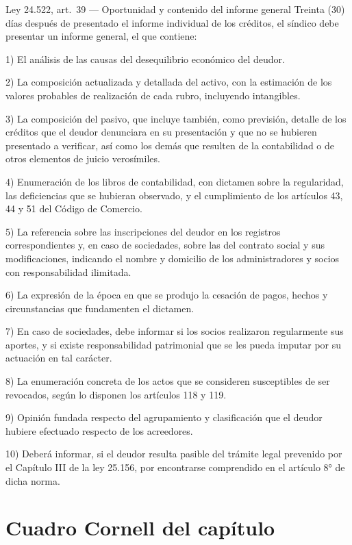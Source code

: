 \documentclass[12pt,oneside]{book}
\begin{document}
\begin{norma}{Ley 24.522, art.\ 39 --- Oportunidad y contenido del informe general}
Treinta (30) días después de presentado el informe individual de los créditos, el síndico debe presentar un informe general, el que contiene:

1) El análisis de las causas del desequilibrio económico del deudor.

2) La composición actualizada y detallada del activo, con la estimación de los valores probables de realización de cada rubro, incluyendo intangibles.

3) La composición del pasivo, que incluye también, como previsión, detalle de los créditos que el deudor denunciara en su presentación y que no se hubieren presentado a verificar, así como los demás que resulten de la contabilidad o de otros elementos de juicio verosímiles.

4) Enumeración de los libros de contabilidad, con dictamen sobre la regularidad, las deficiencias que se hubieran observado, y el cumplimiento de los artículos 43, 44 y 51 del Código de Comercio.

5) La referencia sobre las inscripciones del deudor en los registros correspondientes y, en caso de sociedades, sobre las del contrato social y sus modificaciones, indicando el nombre y domicilio de los administradores y socios con responsabilidad ilimitada.

6) La expresión de la época en que se produjo la cesación de pagos, hechos y circunstancias que fundamenten el dictamen.

7) En caso de sociedades, debe informar si los socios realizaron regularmente sus aportes, y si existe responsabilidad patrimonial que se les pueda imputar por su actuación en tal carácter.

8) La enumeración concreta de los actos que se consideren susceptibles de ser revocados, según lo disponen los artículos 118 y 119.

9) Opinión fundada respecto del agrupamiento y clasificación que el deudor hubiere efectuado respecto de los acreedores.

10) Deberá informar, si el deudor resulta pasible del trámite legal prevenido por el Capítulo III de la ley 25.156, por encontrarse comprendido en el artículo 8° de dicha norma.
\end{norma}

\section{Cuadro Cornell del capítulo}
\end{document}
